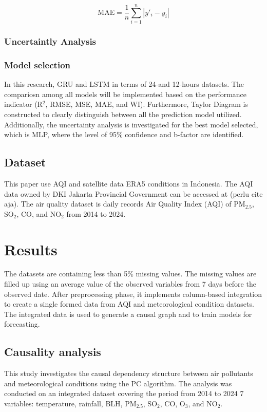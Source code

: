 \documentclass[review,12pt]{elsarticle}
\begin{document}
\begin{equation}
\mathrm{MAE} = \frac{1}{n} \sum_{i=1}^{n} \left| y'_i - y_i \right|
\tag{14}
\end{equation}

\subsubsection{Uncertaintly Analysis}

\subsubsection{Model selection}
In this research, GRU and LSTM in terms of 24-and 12-hours datasets. The compariosn among all models will be implemented based on the performance indicator (R$^{2}$, RMSE, MSE, MAE, and WI). Furthermore, Taylor Diagram is constructed to clearly distinguish between all the prediction model utilized. Additionally, the uncertainty analysis is investigated for the best model selected, which is MLP, where the level of 95\% confidence and b-factor are identified.

\subsection{Dataset}
This paper use AQI and satellite data ERA5 conditions in Indonesia. The AQI data owned by DKI Jakarta Provincial Government can be accessed at (perlu cite aja). The air quality dataset is daily records Air Quality Index (AQI) of  PM$_{2.5}$, SO$_{2}$, CO, and NO$_{2}$ from 2014 to 2024.


\section{Results}
\label{sec3}
The datasets are containing less than 5\% missing values. The missing values are filled up using an average value of the observed variables from 7 days before the observed date. After preprocessing phase, it implements column-based integration to create a single formed data from AQI and meteorological condition datasets. The integrated data is used to generate a causal graph and to train models for forecasting.

\subsection{Causality analysis}
This study investigates the causal dependency structure between air pollutants and meteorological conditions using the PC algorithm. The analysis was conducted on an integrated dataset covering the period from 2014 to 2024 7 variables: temperature, rainfall, BLH, PM$_{2.5}$, SO$_2$, CO, O$_3$, and NO$_2$.
\end{document}
